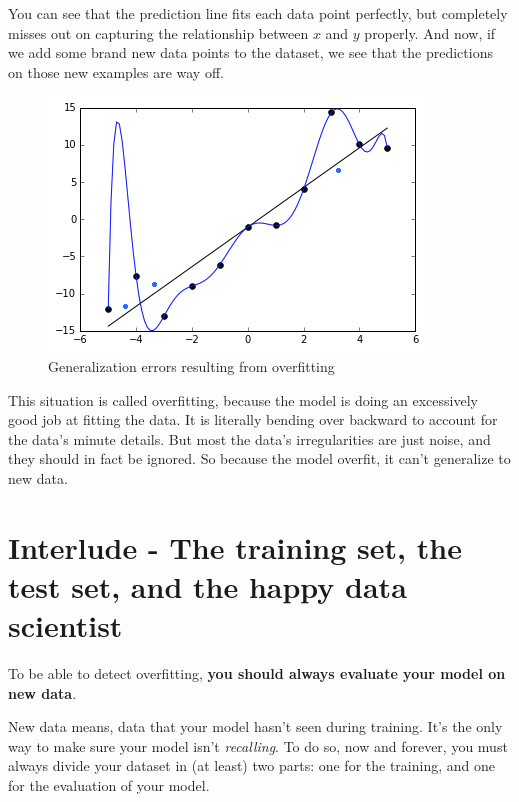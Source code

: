 You can see that the prediction line fits each data point perfectly, but completely misses out on capturing the relationship between $x$ and $y$ properly.
And now, if we add some brand new data points to the dataset, we see that the predictions on those new examples are way off.

\begin{figure}[!h]
    \centering
    \includegraphics[scale=0.6]{assets/overfitt_with_dots.png}
    \caption{Generalization errors resulting from overfitting}
\end{figure}

This situation is called overfitting, because the model is doing an excessively good job at fitting the data.
It is literally bending over backward to account for the data's minute details.
But most the data's irregularities are just noise, and they should in fact be ignored.
So because the model overfit, it can't generalize to new data.

\section*{Interlude - The training set, the test set, and the happy data scientist}
To be able to detect overfitting, \textbf{you should always evaluate your model on new data}.

New data means, data that your model hasn't seen during training.
It's the only way to make sure your model isn't \textit{recalling}.
To do so, now and forever, you must always divide your dataset in (at least) two parts: one for the training, and one for the evaluation of your model.